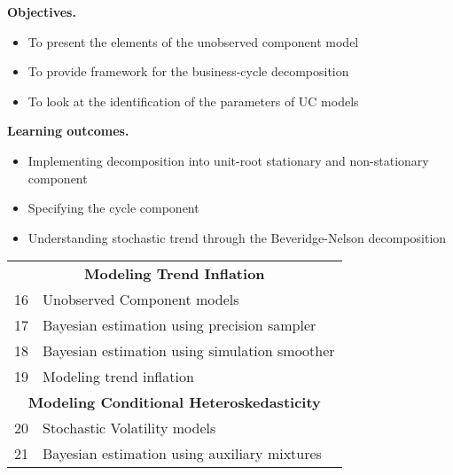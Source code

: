 \documentclass[notes,blackandwhite,mathsans,usenames,dvipsnames]{beamer}
\begin{document}
{
\begin{frame}

\bigskip\textbf{\color{mcxs1}Objectives.}
\begin{itemize}[label=$\blacktriangleright$]
\item {\color{mcxs1}To present the elements of the unobserved component model}
\item {\color{mcxs1}To provide framework for the business-cycle decomposition }
\item {\color{mcxs1}To look at the identification of the parameters of UC models}
\end{itemize}

\bigskip\textbf{\color{lightgray}Learning outcomes.}
\begin{itemize}[label=$\blacktriangleright$]
\item {\color{lightgray}Implementing decomposition into unit-root stationary and non-stationary component}
\item {\color{lightgray}Specifying the cycle component}
\item {\color{lightgray}Understanding stochastic trend through the Beveridge-Nelson decomposition}
\end{itemize}

\end{frame}
}
 


{
\begin{frame}


\bigskip
\begin{center}
\begin{tabular}{ c l}
\toprule 
\multicolumn{2}{c}{\textbf{Modeling Trend Inflation}}\\
16  & Unobserved Component models \\
17  & Bayesian estimation using precision sampler \\
18  & Bayesian estimation using simulation smoother \\
19  & Modeling trend inflation \\[1ex]
\multicolumn{2}{c}{\textbf{Modeling Conditional Heteroskedasticity}}\\
20  & Stochastic Volatility models \\
21  & Bayesian estimation using auxiliary mixtures \\[1ex]
\bottomrule
\end{tabular}
\end{center}


\end{frame}
}
\end{document}
